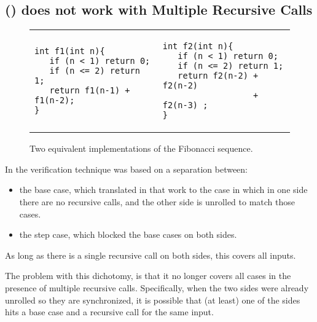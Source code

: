 \subsection{() does not work with Multiple Recursive Calls}
\label{sec:appstepmrc}
\begin{figure}
\begin{center}
\begin{tabular}{ll}
\begin{minipage}{6.5 cm}
\begin{lstlisting}
int f1(int n){
   if (n < 1) return 0;
   if (n <= 2) return 1; 
   return f1(n-1) + f1(n-2);
}
\end{lstlisting} 
\end{minipage} 
&
\begin{minipage}{7 cm}
\begin{lstlisting}
int f2(int n){
   if (n < 1) return 0;
   if (n <= 2) return 1;
   return f2(n-2) + f2(n-2) 
                  + f2(n-3) ;
}
\end{lstlisting}
\end{minipage}
\end{tabular}
\caption{Two equivalent implementations of the Fibonacci sequence.}
\label{fig:f1f2}
\end{center}
\end{figure}

In \cite{DBLP:conf/fm/StrichmanV16} the verification technique was based on a separation between:
\begin{itemize}
\item  the base case, which translated in that work to the case in which in one side there are no recursive calls, and the other side is unrolled to match those cases.
\item  the step case, which blocked the base cases on both sides.
\end{itemize}

As long as there is a single recursive call on both sides, this covers all inputs.

The problem with this dichotomy, is that it no longer covers all cases in the presence of multiple recursive calls. Specifically, when the two sides were already unrolled so they are synchronized, it is possible that (at least) one of the sides hits a base case and a recursive call for the same input.

